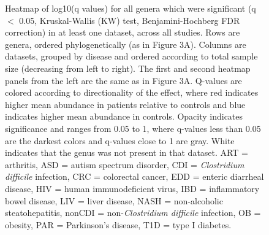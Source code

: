 \begin{figure}[h]
	\begin{center}
    \captionsetup{font=footnotesize,labelfont=footnotesize}
	\caption{Heatmap of log10(q values) for all genera which were significant (q $<$ 0.05, Kruskal-Wallis (KW) test, Benjamini-Hochberg FDR correction) in at least one dataset, across all studies. Rows are genera, ordered phylogenetically (as in Figure 3A). Columns are datasets, grouped by disease and ordered according to total sample size (decreasing from left to right). The first and second heatmap panels from the left are the same as in Figure 3A. Q-values are colored according to directionality of the effect, where red indicates higher mean abundance in patients relative to controls and blue indicates higher mean abundance in controls. Opacity indicates significance and ranges from 0.05 to 1, where q-values less than 0.05 are the darkest colors and q-values close to 1 are gray. White indicates that the genus was not present in that dataset. ART = arthritis, ASD = autism spectrum disorder, CDI = \textit{Clostridium difficile} infection, CRC = colorectal cancer, EDD = enteric diarrheal disease, HIV = human immunodeficient virus, IBD = inflammatory bowel disease, LIV = liver disease, NASH = non-alcoholic steatohepatitis, nonCDI = non-\textit{Clostridium difficile} infection, OB = obesity, PAR = Parkinson's disease, T1D = type I diabetes.
}
	\label{fig:overall_heatmap_qvalues}
	\end{center}
\end{figure}

